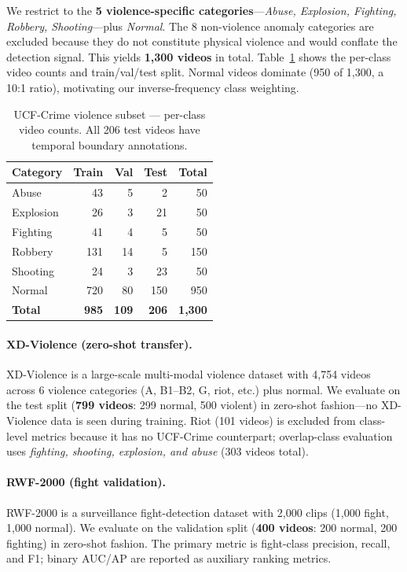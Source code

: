 \documentclass[11pt]{article}
\begin{document}
We restrict to the \textbf{5 violence-specific categories}—\emph{Abuse,
Explosion, Fighting, Robbery, Shooting}—plus \emph{Normal}.
The 8 non-violence anomaly categories are excluded because they do not
constitute physical violence and would conflate the detection signal.
This yields \textbf{1,300 videos} in total.
Table~\ref{tab:dataset} shows the per-class video counts and train/val/test
split. Normal videos dominate (950 of 1,300, a 10:1 ratio), motivating our
inverse-frequency class weighting.

\begin{table}[t]
  \centering
  \caption{UCF-Crime violence subset — per-class video counts.
           All 206 test videos have temporal boundary annotations.}
  \label{tab:dataset}
  \small
  \begin{tabular}{lrrrr}
    \toprule
    \textbf{Category} & \textbf{Train} & \textbf{Val} &
                        \textbf{Test} & \textbf{Total} \\
    \midrule
    Abuse      &  43 &  5 &   2 &   50 \\
    Explosion  &  26 &  3 &  21 &   50 \\
    Fighting   &  41 &  4 &   5 &   50 \\
    Robbery    & 131 & 14 &   5 &  150 \\
    Shooting   &  24 &  3 &  23 &   50 \\
    \midrule
    Normal     & 720 & 80 & 150 &  950 \\
    \midrule
    \textbf{Total} & \textbf{985} & \textbf{109} & \textbf{206} &
                     \textbf{1,300} \\
    \bottomrule
  \end{tabular}
\end{table}

\paragraph{XD-Violence (zero-shot transfer).}
XD-Violence \citep{wu2020not} is a large-scale multi-modal violence dataset
with 4,754 videos across 6 violence categories (A, B1–B2, G, riot, etc.)
plus normal.
We evaluate on the test split (\textbf{799 videos}: 299 normal, 500 violent)
in zero-shot fashion—no XD-Violence data is seen during training.
Riot (101 videos) is excluded from class-level metrics because it has no
UCF-Crime counterpart; overlap-class evaluation uses
\emph{fighting, shooting, explosion, and abuse} (303 videos total).

\paragraph{RWF-2000 (fight validation).}
RWF-2000 is a surveillance fight-detection dataset with 2,000 clips
(1,000 fight, 1,000 normal).
We evaluate on the validation split (\textbf{400 videos}: 200 normal,
200 fighting) in zero-shot fashion.
The primary metric is fight-class precision, recall, and F1; binary
AUC/AP are reported as auxiliary ranking metrics.
\end{document}
